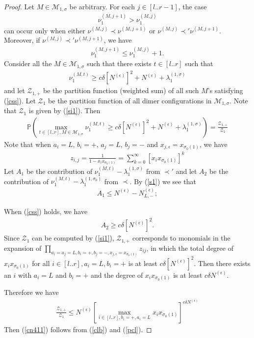 \documentclass[11pt]{amsart}
\theoremstyle{plain}
\theoremstyle{definition}
\theoremstyle{remark}
\newcommand\si{\sigma}
\numberwithin{equation}{section}
\numberwithin{theorem}{section}
\numberwithin{figure}{section}
\begin{document}
\begin{proof}Let $M\in \mathcal{M}_{1,\si}$ be arbitrary. For each $j\in [l..r-1]$, the case 
\begin{align*}
\nu^{(M,j+1)}_1>\nu^{(M,j)}_1
\end{align*}
can occur only when either $\nu^{(M,j)}\prec \nu^{(M,j+1)}$ or $\nu^{(M,j)}\prec'\nu^{(M,j+1)}$. Moreover, if $\nu^{(M,j)}\prec'\nu^{(M,j+1)}$, we have
\begin{align}
\nu^{(M,j+1)}_1\leq \nu^{(M,j)}_1+1.\label{s1}
\end{align}
Consider all the $M\in \mathcal{M}_{1,\si}$ such that  there exists $t\in[l..r]$ such that 
\begin{align}
\nu_1^{(M,t)}\geq c\delta[N^{(\epsilon)}]^2+N^{(\epsilon)}+\lambda_1^{(1,\si)}\label{css}
\end{align}
and let $\mathcal{Z}_{1,+}$ be the partition function (weighted sum) of all such $M$'s satisfying (\ref{css}). Let $\mathcal{Z}_1$ be the partition function of all dimer configurations in $\mathcal{M}_{1,\si}$. Note that $\mathcal{Z}_1$ is given by (\ref{si1}). Then
\begin{align*}
\mathbb{P}\left(\max_{t\in[l..r],M\in \mathcal{M}_{1,\si}}\nu_1^{(M,t)}\geq c\delta[N^{(\epsilon)}]^2+N^{(\epsilon)}+\lambda_1^{(1,\si)}\right)=\frac{\mathcal{Z}_{1,+}}{\mathcal{Z}_1}
\end{align*}
Note that when $a_i=L$, $b_i=+$, $a_j=L$, $b_j=-$ and $x_{j,\epsilon}=x_{\si_0(1)}$, we have
\begin{align*}
z_{i,j}=\frac{1}{1-x_{i}x_{\si_0(1)}}=\sum_{k=0}^{\infty}[x_ix_{\si_0(1)}]^k
\end{align*}
 Let $A_1$ be the contribution of $\nu_1^{(M,t)}-\lambda_1^{(1,\sigma)}$ from $\prec'$ and let $A_2$ be the contribution of $\nu_1^{(M,t)}-\lambda_1^{(1,\sigma_0)}$ from $\prec$. By (\ref{s1}) we see that
 \begin{align*}
 A_1\leq N^{(\epsilon)}-N_{L,-}^{(\epsilon)};
 \end{align*}

When (\ref{css}) holds, we have
\begin{align*}
A_2\geq c\delta [N^{(\epsilon)}]^2.
\end{align*}
Since $\mathcal{Z}_1$ can be computed by (\ref{si1}), $\mathcal{Z}_{1,+}$ corresponds to monomials in the expansion of $\prod_{a_i=a_j=L, b_i=+, b_j=-, x_{j,\epsilon}=x_{\si_0(1)}}z_{ij}$, in which the total degree of $x_ix_{\si_0(1)}$ for all $i\in[l..r],a_i=L,b_i=+$ is at least $c\delta [N^{(\epsilon)}]^2$. Then there exists an $i$ with $a_i=L$ and $b_i=+$ and the degree of $x_ix_{\si_0(1)}$ is at least $c\delta N^{(\epsilon)}$.

Therefore we have 
\begin{align}
\frac{\mathcal{Z}_{1,+}}{\mathcal{Z}_1}\leq N^{(\epsilon)}\left[\max_{i\in[l..r],b_i=+,a_i=L} x_{i}x_{\si_0(1)}\right]^{c\delta N^{(\epsilon)}}\label{pcl}
\end{align}
Then (\ref{cn411}) follows from (\ref{clb}) and (\ref{pcl}).
\end{proof}
\end{document}
